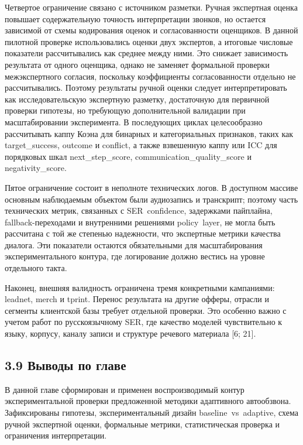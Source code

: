 \documentclass[a4paper,14pt]{extarticle}
\renewcommand{\texttt}[1]{\textnormal{#1}}
\begin{document}
Четвертое ограничение связано с источником разметки. Ручная экспертная
оценка повышает содержательную точность интерпретации звонков, но
остается зависимой от схемы кодирования оценок и согласованности
оценщиков. В данной пилотной проверке использовались оценки двух
экспертов, а итоговые числовые показатели рассчитывались как среднее
между ними. Это снижает зависимость результата от одного оценщика,
однако не заменяет формальной проверки межэкспертного согласия,
поскольку коэффициенты согласованности отдельно не рассчитывались.
Поэтому результаты ручной оценки следует интерпретировать как
исследовательскую экспертную разметку, достаточную для первичной
проверки гипотезы, но требующую дополнительной валидации при
масштабировании эксперимента. В последующих циклах целесообразно
рассчитывать каппу Коэна для бинарных и категориальных признаков, таких
как \texttt{target\_\allowbreak{}success}, \texttt{outcome} и \texttt{conflict}, а
также взвешенную каппу или \texttt{ICC} для порядковых шкал
\texttt{next\_\allowbreak{}step\_\allowbreak{}score}, \texttt{communication\_\allowbreak{}quality\_\allowbreak{}score} и
\texttt{negativity\_\allowbreak{}score}.

Пятое ограничение состоит в неполноте технических логов. В доступном
массиве основным наблюдаемым объектом были аудиозапись и транскрипт;
поэтому часть технических метрик, связанных с \texttt{SER\ confidence},
задержками пайплайна, \texttt{fallback}-переходами и внутренними
решениями \texttt{policy\ layer}, не могла быть рассчитана с той же
степенью надежности, что экспертные метрики качества диалога. Эти
показатели остаются обязательными для масштабирования экспериментального
контура, где логирование должно вестись на уровне отдельного такта.

Наконец, внешняя валидность ограничена тремя конкретными кампаниями:
\texttt{leadnet}, \texttt{merch} и \texttt{tprint}. Перенос результата
на другие офферы, отрасли и сегменты клиентской базы требует отдельной
проверки. Это особенно важно с учетом работ по русскоязычному SER, где
качество моделей чувствительно к языку, корпусу, каналу записи и
структуре речевого материала {[}6; 21{]}.

\subsection{3.9 Выводы по
главе}\label{ux432ux44bux432ux43eux434ux44b-ux43fux43e-ux433ux43bux430ux432ux435-2}

В данной главе сформирован и применен воспроизводимый контур
экспериментальной проверки предложенной методики адаптивного
автообзвона. Зафиксированы гипотезы, экспериментальный дизайн
\texttt{baseline\ vs\ adaptive}, схема ручной экспертной оценки,
формальные метрики, статистическая проверка и ограничения интерпретации.
\end{document}
